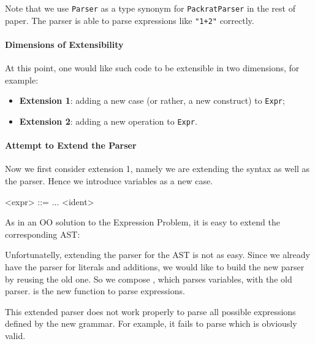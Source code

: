 
\noindent Note that we use \lstinline{Parser} as a type synonym for
\lstinline{PackratParser} in the rest of paper. 
The parser  is able to parse 
expressions like \lstinline{"1+2"} correctly. 

\paragraph{Dimensions of Extensibility}
At this point, one would like such code to be extensible in two dimensions, for example:
\begin{itemize}
\item \textbf{Extension 1}: adding a new case (or rather, a new construct) to \lstinline{Expr};
\item \textbf{Extension 2}: adding a new operation to \lstinline{Expr}.
\end{itemize}

\paragraph{Attempt to Extend the Parser} Now we first consider 
extension 1, namely we are extending the syntax as well as the parser. Hence we introduce variables as a new case.

\setlength{\grammarindent}{5em}
\begin{grammar}
<expr> ::= ...
   \alt <ident>
\end{grammar}

As in an OO solution to the Expression Problem, it is easy to extend
the corresponding AST:


Unfortunatelly, extending the parser for the AST is not as easy.
Since we already have the parser for literals and additions, we would
like to build the new parser by reusing the old one. So we compose
, which parses variables, with the old
parser.  is the new function to parse
expressions.


\noindent This extended parser does not work properly to parse all possible expressions defined by the new grammar. For example, it fails to parse  which is obviously valid.

